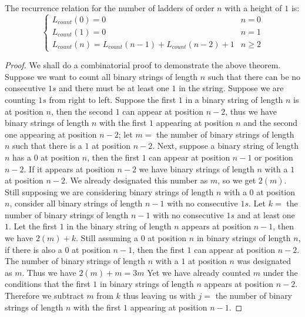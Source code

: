    \begin{theorem}
       The recurrence relation for the number of ladders of order $n$ with a height of $1$ is:
      \[   \left\{
        \begin{array}{ll}
        L_{count}(0) = 0 & n = 0 \\
        L_{count}(1) = 0 & n=1 \\
        L_{count}(n) = L_{count}(n-1) + L_{count}(n-2) + 1 & n \geq 2 
        \end{array} 
    \right. \]
   \end{theorem}
\begin{proof}
    We shall do a combinatorial proof to demonstrate the above theorem. 
    Suppose we want to count all binary strings of length $n$ such that there 
    can be no consecutive $1s$ and there must be at least one $1$ in the string. Suppose we are counting $1s$ from right to left. Suppose the first $1$ in a binary string of length $n$ is at position $n$, 
    then the second $1$ can appear at position $n-2$, thus we have binary 
    strings of length $n$ with the first $1$ appearing at position $n$ and the second one appearing at position $n-2$; 
    let $m=$ the number of binary strings of length $n$ such that there is a $1$ 
    at position $n-2$. Next, suppose a binary string of length $n$ has a $0$ at position $n$, then
    the first $1$ can appear at position $n-1$ or position $n-2$. 
    If it appears at position $n-2$ we have binary strings of length $n$ with a $1$ at position $n-2$. 
    We already designated this number as $m$, so we get $2(m)$. 
    Still supposing we are considering binary strings of length $n$ with a $0$ at position $n$, consider all binary strings of length $n-1$ with 
    no consecutive $1s$. Let $k=$ the number of binary strings of length $n-1$ with no consecutive $1s$ and at least one $1$.
    Let the first $1$ in the binary string of length $n$ appears at position $n-1$, then we have $2(m)+k$. 
    Still assuming a $0$ at position $n$
    in binary strings of length $n$, if there is also a $0$ at position $n-1$, then the first $1$ can appear at position $n-2$. 
    The number of 
    binary strings of length $n$ with a $1$ at position $n$ was designated as $m$. 
    Thus we have $2(m)+m=3m$
    Yet we have already counted $m$ 
    under the conditions that the first $1$ in binary strings of length $n$ appears at position $n-2$. 
    Therefore we subtract 
    $m$ from $k$ thus leaving us with $j=$ the number of binary strings of length $n$ with the first $1$ appearing at position $n-1$. 

\end{proof}
